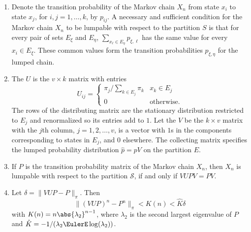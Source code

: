 \documentclass[12pt]{article}
\begin{document}
\begin{enumerate}
    \item
        Denote the transition probability of the Markov chain \( X_n \)
        from state \( x_i \) to state \( x_j \), for \( i, j = 1, \dots,
        k \), by \( p_{ij} \).  A necessary and sufficient condition for
        the Markov chain \( X_n \) to be lumpable with respect to the
        partition \( S \) is that for every pair of sets \( E_{\xi} \)
        and \( E_{\eta} \), \( \sum_{x_{\ell} \in E_{\eta}} p_{\xi,\ell} \) has the
        same value for every \( x_i \in E_{\xi} \).  These common values
        form the transition probabilities \( p_{\xi, \eta} \) for the
        lumped chain.
    \item The %
\( U \) is the \( v \times k \) matrix with entries
\[
    U_{ij} =
    \begin{cases}
        \pi_j/\sum_{k \in E_j} \pi_k & x_k \in E_j \\
        0 & \text{otherwise}.
    \end{cases}
\] The rows of the distributing matrix are the stationary distribution
restricted to \( E_j \) and renormalized so its entries add to \( 1 \).    
        Let the %
        \( V \) be the \( k \times v \) matrix with the \( j \)th
        column, \( j = 1, 2, \dots, v \), is a vector with \( 1 \)s in
        the components corresponding to states in \( E_j \), and \( 0 \)
        elsewhere.  The collecting matrix specifies the lumped
        probability distribution \( \hat{p} = p V \) on the partition \(
        E \).
    \item
        If \( P \) is the transition probability matrix of the Markov
        chain \( X_n \), then \( X_n \) is lumpable with respect to the
        partition \( \mathcal{S} \), if and only if \( VUPV = PV \).
    \item
        Let \( \delta = \| VUP - P \|_{\pi} \).  Then
        \[
            \| (VUP)^n - P^n \|_{\pi} < K(n) < \hat{K} \delta
        \] with \( K(n) = n \abs{\lambda_2}^{n-1} \), where \( \lambda_2
        \) is the second largest eigenvalue of \( P \) and \( \hat{K} =
        -1/(\lambda_2 \EulerE \log(\lambda_2)) \).
\end{enumerate}

\hr

\end{document}
